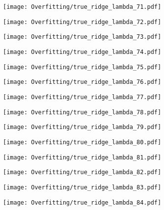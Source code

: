 \documentclass[xcolor=pdftex,dvipsnames,table]{beamer}
\begin{document}
\frame
{
	\begin{center}
		\texttt{[image: Overfitting/true\_ridge\_lambda\_71.pdf]}
	\end{center}
}
\frame
{
	\begin{center}
		\texttt{[image: Overfitting/true\_ridge\_lambda\_72.pdf]}
	\end{center}
}
\frame
{
	\begin{center}
		\texttt{[image: Overfitting/true\_ridge\_lambda\_73.pdf]}
	\end{center}
}
\frame
{
	\begin{center}
		\texttt{[image: Overfitting/true\_ridge\_lambda\_74.pdf]}
	\end{center}
}
\frame
{
	\begin{center}
		\texttt{[image: Overfitting/true\_ridge\_lambda\_75.pdf]}
	\end{center}
}
\frame
{
	\begin{center}
		\texttt{[image: Overfitting/true\_ridge\_lambda\_76.pdf]}
	\end{center}
}
\frame
{
	\begin{center}
		\texttt{[image: Overfitting/true\_ridge\_lambda\_77.pdf]}
	\end{center}
}
\frame
{
	\begin{center}
		\texttt{[image: Overfitting/true\_ridge\_lambda\_78.pdf]}
	\end{center}
}
\frame
{
	\begin{center}
		\texttt{[image: Overfitting/true\_ridge\_lambda\_79.pdf]}
	\end{center}
}
\frame
{
	\begin{center}
		\texttt{[image: Overfitting/true\_ridge\_lambda\_80.pdf]}
	\end{center}
}
\frame
{
	\begin{center}
		\texttt{[image: Overfitting/true\_ridge\_lambda\_81.pdf]}
	\end{center}
}
\frame
{
	\begin{center}
		\texttt{[image: Overfitting/true\_ridge\_lambda\_82.pdf]}
	\end{center}
}
\frame
{
	\begin{center}
		\texttt{[image: Overfitting/true\_ridge\_lambda\_83.pdf]}
	\end{center}
}
\frame
{
	\begin{center}
		\texttt{[image: Overfitting/true\_ridge\_lambda\_84.pdf]}
	\end{center}
}
\end{document}
